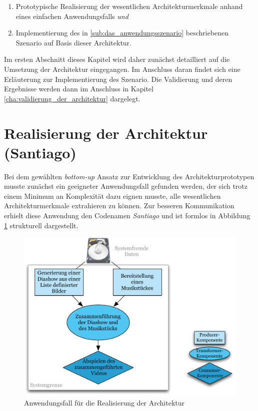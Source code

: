   \begin{enumerate}
    \item Prototypische Realisierung der wesentlichen Architekturmerkmale anhand eines einfachen Anwendungsfalls \emph{und}
    \item Implementierung des in \ref{sub:das_anwendungsszenario} beschriebenen Szenario auf Basis dieser Architektur.
  \end{enumerate}
  
  Im ersten Abschnitt dieses Kapitel wird daher zunächst detailliert auf die Umsetzung der Architektur eingegangen. Im Anschluss daran findet sich eine Erläuterung zur Implementierung des Szenario. Die Validierung und deren Ergebnisse werden dann im Anschluss in Kapitel \ref{cha:validierung_der_architektur} dargelegt.

\section{Realisierung der Architektur (Santiago)} %
\label{sec:realisierung_der_architektur}

  Bei dem gewählten \emph{bottom-up} Ansatz zur Entwicklung des Architekturprototypen musste zunächst ein geeigneter Anwendungsfall gefunden werden, der sich trotz einem Minimum an Komplexität dazu eignen musste, alle wesentlichen Architekturmerkmale extrahieren zu können. Zur besseren Kommunikation erhielt diese Anwendung den Codenamen \emph{Santiago} und ist formlos in Abbildung \ref{fig:images_Santiago_Anwendungsfall} strukturell dargestellt.

  \begin{figure}[!hb]
    \centering
      \includegraphics[width=.7\textwidth]{images/Santiago_Anwendungsfall.pdf}
    \caption{Anwendungsfall für die Realisierung der Architektur}
    \label{fig:images_Santiago_Anwendungsfall}
  \end{figure}

